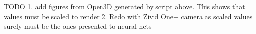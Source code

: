 TODO 
1. add figures from Open3D generated by script above.
This shows that values must be scaled to render
2. Redo with Zivid One+ camera as scaled values surely must be the ones presented to neural nets









